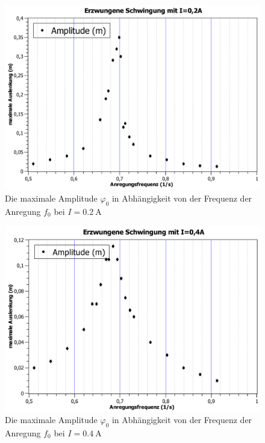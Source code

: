 \documentclass[
	a4paper,
	12pt,
	pagesize,
	ngerman
]{scrartcl}
\begin{document}
	\begin{figure}[htb]
		\includegraphics[width=1\textwidth]{erzwungene_Schwingung_0,2A}
		\centering
		\caption{Die maximale Amplitude $ \varphi_0 $ in Abhängigkeit von der Frequenz der Anregung $ f_0 $ bei $I=\SI{0,2}{\ampere}$}
		\label{erzw02A_Schwingung}
		\centering
	\end{figure}
	\begin{figure}[htb]
		\includegraphics[width=1\textwidth]{erzwungene_Schwingung_0,4A}
		\centering
		\caption{Die maximale Amplitude $ \varphi_0 $ in Abhängigkeit von der Frequenz der Anregung $ f_0 $  bei $I=\SI{0,4}{\ampere}$}
		\label{erzw04A_Schwingung}
		\centering
	\end{figure}
\end{document}
